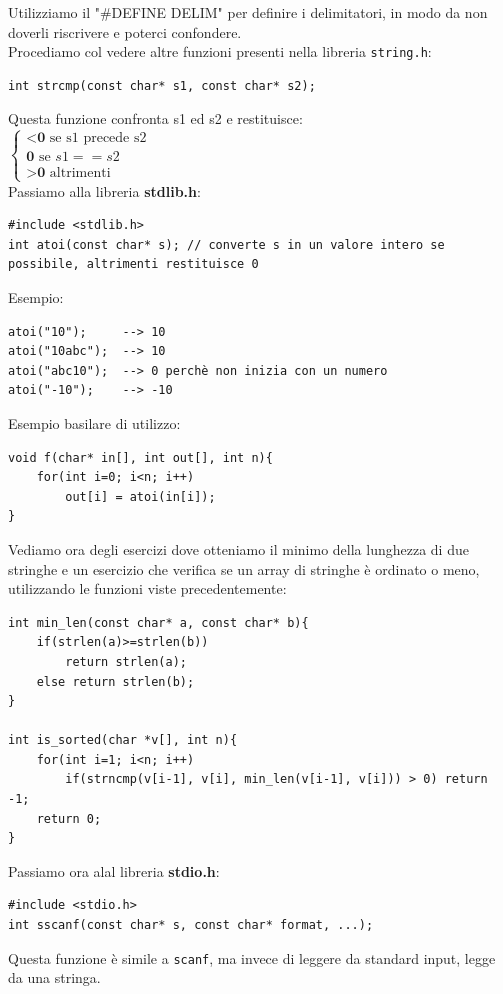 Utilizziamo il "\#DEFINE DELIM" per definire i delimitatori, in modo da 
non doverli riscrivere e poterci confondere.\medskip\\
Procediamo col vedere altre funzioni presenti nella libreria \texttt{string.h}:
\begin{verbatim}
int strcmp(const char* s1, const char* s2);
\end{verbatim}
Questa funzione confronta s1 ed s2 e restituisce: \medskip\\
$
\begin{cases}
    \textbf{$<$0} \text{        se s1 precede s2} \\
    \textbf{0}    \text{        se } s1 == s2 \\
    \textbf{$>$0} \text{        altrimenti}
\end{cases}
$\bigskip\\
Passiamo alla libreria \textbf{stdlib.h}:
\begin{verbatim}
#include <stdlib.h>
int atoi(const char* s); // converte s in un valore intero se possibile, altrimenti restituisce 0
\end{verbatim}
Esempio:
\begin{verbatim}
atoi("10");     --> 10
atoi("10abc");  --> 10
atoi("abc10");  --> 0 perchè non inizia con un numero
atoi("-10");    --> -10
\end{verbatim}
Esempio basilare di utilizzo:
\begin{verbatim}
void f(char* in[], int out[], int n){
    for(int i=0; i<n; i++)
        out[i] = atoi(in[i]);
}
\end{verbatim}
Vediamo ora degli esercizi dove otteniamo il minimo della lunghezza di due stringhe 
e un esercizio che verifica se un array di stringhe è ordinato o meno, utilizzando le funzioni viste
precedentemente:
\begin{verbatim}
int min_len(const char* a, const char* b){
    if(strlen(a)>=strlen(b))
        return strlen(a);
    else return strlen(b);
}

int is_sorted(char *v[], int n){
    for(int i=1; i<n; i++)
        if(strncmp(v[i-1], v[i], min_len(v[i-1], v[i])) > 0) return -1;
    return 0;
}
\end{verbatim}
Passiamo ora alal libreria \textbf{stdio.h}:
\begin{verbatim}
#include <stdio.h>
int sscanf(const char* s, const char* format, ...); 
\end{verbatim}
Questa funzione è simile a \texttt{scanf}, ma invece di leggere da standard input, legge da una stringa. 
